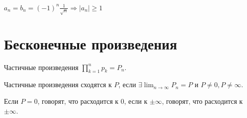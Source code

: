 \begin{ex}
    $ a_n = b_n = (-1)^{n}\frac{1}{\sqrt{ n} } \Longrightarrow  \lvert a_n \rvert \ge 1$
\end{ex}

\section{Бесконечные произведения}
\begin{defn}
	{\sf Частичные произведения} $ \prod_{k=1}^{n}p_k =P_n$.

	Частичные произведения {\sf сходятся} к $ P$, если  $ \exists  \lim_{n \to \infty} P_n = P$ и $ P\ne 0, P \ne \infty$.

	Если $ P=0$, говорят, что {\sf расходится к $0$}, если к  $ \pm \infty$, говорят, {\sf что расходится к $ \pm \infty$}.
\end{defn}


